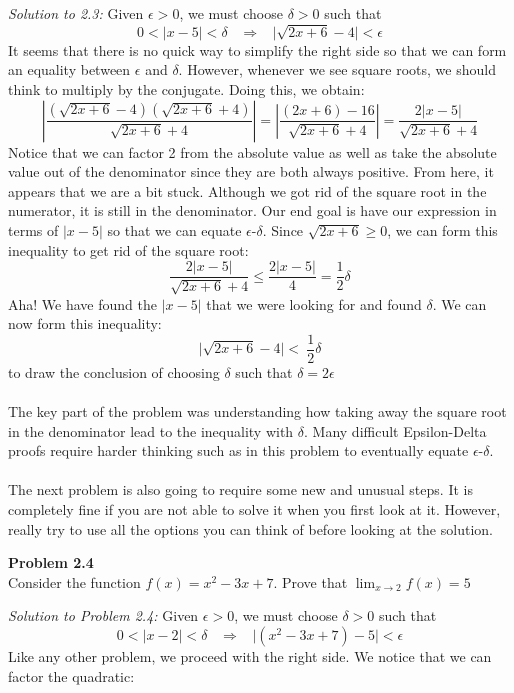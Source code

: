 \documentclass[11pt]{scrartcl}
\begin{document}
\noindent
\textit{Solution to 2.3:} Given $\epsilon>0$, we must choose $\delta>0$ such that 
$$0<\lvert x-5 \rvert<\delta \;\;\;\Longrightarrow\;\;\; \lvert \sqrt{2x+6}-4 \rvert<\epsilon$$
It seems that there is no quick way to simplify the right side so that we can form an equality between $\epsilon$ and $\delta$. However, whenever we see square roots, we should think to multiply by the conjugate. Doing this, we obtain:
$$\left|\frac{(\sqrt{2x+6}-4)(\sqrt{2x+6}+4)}{\sqrt{2x+6}+4}\right|=\left|\frac{(2x+6)-16}{\sqrt{2x+6}+4}\right|=\frac{2\lvert x-5 \rvert}{\sqrt{2x+6}+4}$$
Notice that we can factor 2 from the absolute value as well as take the absolute value out of the denominator since they are both always positive. From here, it appears that we are a bit stuck. Although we got rid of the square root in the numerator, it is still in the denominator. Our end goal is have our expression in terms of $\lvert x-5 \rvert$ so that we can equate $\epsilon$-$\delta$. Since $\sqrt{2x+6}\ge0$, we can form this inequality to get rid of the square root:
$$\frac{2\lvert x-5 \rvert}{\sqrt{2x+6}+4}\le \frac{2\lvert x-5 \rvert}{4}=\frac{1}{2}\delta$$
Aha! We have found the $\lvert x-5 \rvert$ that we were looking for and found $\delta$. We can now form this inequality:
$$\lvert \sqrt{2x+6}-4 \rvert<\ \frac{1}{2}\delta$$
to draw the conclusion of choosing $\delta$ such that $\delta=2\epsilon$\\
\noindent\\
The key part of the problem was understanding how taking away the square root in the denominator lead to the inequality with $\delta$. Many difficult Epsilon-Delta proofs require harder thinking such as in this problem to eventually equate $\epsilon$-$\delta$. \\
\noindent\\
The next problem is also going to require some new and unusual steps. It is completely fine if you are not able to solve it when you first look at it. However, really try to use all the options you can think of before looking at the solution. \\
\begin{tcolorbox}
\textbf{Problem 2.4}\\
Consider the function $f(x)=x^2-3x+7$. Prove that $\lim_{x \to 2} f(x)=5$
\end{tcolorbox}
\noindent
\textit{Solution to Problem 2.4:} Given $\epsilon>0$, we must choose $\delta>0$ such that 
$$0<\lvert x-2 \rvert<\delta \;\;\;\Longrightarrow\;\;\; \lvert (x^2-3x+7)-5 \rvert<\epsilon$$
Like any other problem, we proceed with the right side. We notice that we can factor the quadratic:
\end{document}
